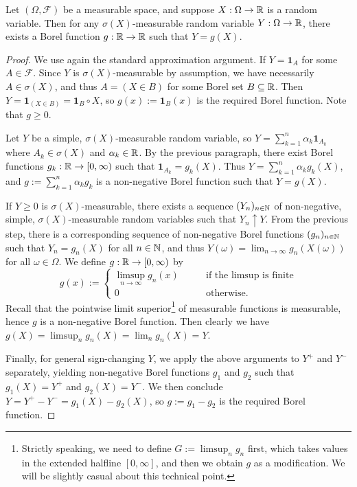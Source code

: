 \begin{theorem}
\label{thm:doob-dynkin}
    Let $(\Omega,\mathcal{F})$ be a measurable space, and suppose $X:\Omega\to\mathbb{R}$ is a random variable. Then for any $\sigma(X)$-measurable random variable $Y:\Omega\to\mathbb{R}$, there exists a Borel function $g:\mathbb{R}\to\mathbb{R}$ such that $Y=g(X)$.
\end{theorem}

\begin{proof}
    We use again the standard approximation argument. If $Y=\mathbf{1}_A$ for some $A\in\mathcal{F}$. Since $Y$ is $\sigma(X)$-measurable by assumption, we have necessarily $A\in\sigma(X)$, and thus $A=(X\in B)$ for some Borel set $B\subseteq\mathbb{R}$. Then $Y=\mathbf{1}_{(X\in B)}=\mathbf{1}_B\circ X$, so $g(x):=\mathbf{1}_B(x)$ is the required Borel function. Note that $g\ge 0$.

    Let $Y$ be a simple, $\sigma(X)$-measurable random variable, so $Y=\sum_{k=1}^n \alpha_k \mathbf{1}_{A_k}$ where $A_k\in\sigma(X)$ and $\alpha_k\in\mathbb{R}$. By the previous paragraph, there exist Borel functions $g_k:\mathbb{R}\to [0,\infty)$ such that $\mathbf{1}_{A_k}=g_k(X)$. Thus $Y=\sum_{k=1}^n \alpha_k g_k(X)$, and $g:=\sum_{k=1}^n \alpha_k g_k$ is a non-negative Borel function such that $Y=g(X)$.

    If $Y\ge 0$ is $\sigma(X)$-measurable, there exists a sequence $(Y_n)_{n\in\mathbb{N}}$ of non-negative, simple, $\sigma(X)$-measurable random variables such that $Y_n\uparrow Y$. From the previous step, there is a corresponding sequence of non-negative Borel functions $(g_n)_{n\in\mathbb{N}}$ such that $Y_n = g_n(X)$ for all $n\in\mathbb{N}$, and thus $Y(\omega)=\lim_{n\to\infty}g_n(X(\omega))$ for all $\omega\in\Omega$. We define $g:\mathbb{R}\to [0,\infty)$ by
    \begin{equation*}
        g(x) := \begin{cases}
        \limsup\limits_{n\to\infty}g_n(x) \qquad&\text{if the limsup is finite} \\
        0 \qquad&\text{otherwise}.
        \end{cases}
    \end{equation*}
    Recall that the pointwise limit superior\footnote{Strictly speaking, we need to define $G:=\limsup_n g_n$ first, which takes values in the extended halfline $[0,\infty]$, and then we obtain $g$ as a modification. We will be slightly casual about this technical point.} of measurable functions is measurable, hence $g$ is a non-negative Borel function. Then clearly we have $g(X)=\limsup_n g_n(X)=\lim_n g_n(X)=Y$.

    Finally, for general sign-changing $Y$, we apply the above arguments to $Y^+$ and $Y^-$ separately, yielding non-negative Borel functions $g_1$ and $g_2$ such that $g_1(X)=Y^+$ and $g_2(X)=Y^-$. We then conclude $Y=Y^+ -Y^- = g_1(X)-g_2(X)$, so $g:=g_1-g_2$ is the required Borel function.
\end{proof}

